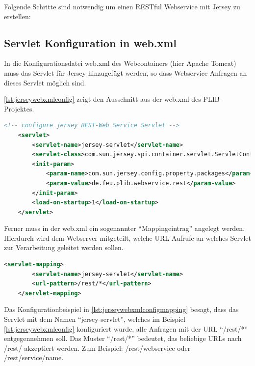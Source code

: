 Folgende Schritte sind notwendig um einen \gls{REST}ful Webservice mit Jersey zu erstellen: 

\subsection{Servlet Konfiguration in web.xml} 

In die Konfigurationsdatei web.xml des Webcontainers (hier \gls{Apache Tomcat}) muss das Servlet für \gls{Jersey} hinzugefügt werden, so dass \gls{Webservice} Anfragen an dieses Servlet möglich sind. 

\autoref{lst:jerseywebxmlconfig} zeigt den Ausschnitt aus der web.xml des \gls{PLIB}-Projektes. 

 \begin{lstlisting}[caption=Jersey Servlet Konfiguration in web.xml, language=XML, label=lst:jerseywebxmlconfig]
 <!-- configure jersey REST-Web Service Servlet -->
    <servlet>
        <servlet-name>jersey-servlet</servlet-name>
        <servlet-class>com.sun.jersey.spi.container.servlet.ServletContainer</servlet-class>
        <init-param>
            <param-name>com.sun.jersey.config.property.packages</param-name>
            <param-value>de.feu.plib.webservice.rest</param-value>
        </init-param>
        <load-on-startup>1</load-on-startup>
    </servlet>
 \end{lstlisting}   
 
Ferner muss in der web.xml ein sogenannter \enquote{Mappingeintrag} angelegt werden. Hierdurch wird dem Webserver mitgeteilt, welche \gls{URL}-Aufrufe an welches \gls{Servlet} zur Verarbeitung geleitet werden sollen. 
 
  \begin{lstlisting}[caption=Jersey Servlet Mappingkonfiguration in web.xml, language=XML, label=lst:jerseywebxmlconfigmapping]
    <servlet-mapping>
        <servlet-name>jersey-servlet</servlet-name>
        <url-pattern>/rest/*</url-pattern>
    </servlet-mapping>
 \end{lstlisting}  
 
Das Konfigurationbeispiel in \autoref{lst:jerseywebxmlconfigmapping}  besagt, dass das \gls{Servlet} mit dem Namen \enquote{jersey-servlet}, welches im Beispiel \autoref{lst:jerseywebxmlconfig}  konfiguriert wurde, alle Anfragen mit der URL \enquote{/rest/*} entgegennehmen soll. Das Muster \enquote{/rest/*} bedeutet, das beliebige URLs nach /rest/ akzeptiert werden. Zum Beispiel: /rest/webservice oder /rest/service/name.

